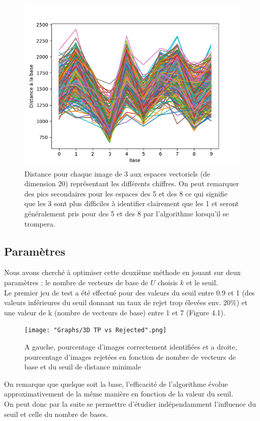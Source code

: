 \documentclass[a4paper,11pt,twoside]{report}
\begin{document}
\begin{figure}[H]
\begin{center}

  	\includegraphics[width=0.7\linewidth]{Graphs/Distance_bases_20_3.png}
  	\caption{Distance pour chaque image de 3 aux espaces vectoriels (de dimension 20) représentant les différents chiffres. On peut remarquer des pics secondaires pour les espaces des 5 et des 8 ce qui signifie que les 3 sont plus difficiles à identifier clairement que les 1 et seront généralement pris pour des 5 et des 8 par l'algorithme lorsqu'il se trompera.}
\end{center}
\end{figure}


\subsection{Paramètres}
Nous avons cherché à optimiser cette deuxième méthode en jouant sur deux paramètres : le nombre de vecteurs de base de $U$ choisis $k$ et le seuil.\\
Le premier jeu de test a été effectué pour des valeurs du seuil entre 0.9 et 1 (des valeurs inférieures du seuil donnant un taux de rejet trop élevées env. 20\%) et une valeur de k (nombre de vecteurs de base) entre 1 et 7 (Figure 4.1).\\

\begin{figure}[H]
  	\texttt{[image: "Graphs/3D TP vs Rejected".png]}
  	\caption{A gauche, pourcentage d'images correctement identifiées et a droite, pourcentage d'images rejetées en fonction de nombre de vecteurs de base et du seuil de distance minimale}
\end{figure}

On remarque que quelque soit la base, l'efficacité de l'algorithme évolue approximativement de la même manière en fonction de la valeur du seuil. \\ 
On peut donc par la suite se permettre d'étudier indépendamment l'influence du seuil et celle du nombre de bases.
\end{document}
